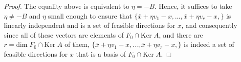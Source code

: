 \documentclass[10pt,a4paper]{amsart}
\newcommand{\Ker}[0]{\mathrm{Ker}\;}
\renewcommand{\dim}[0]{\mathrm{dim}\;}
\begin{document}
\begin{proof}
        \vspace{5mm}
        
        The equality above is equivalent to $\eta = -B$. Hence, it suffices to take $\eta\neq -B$ and $\eta$ small enough to ensure that $\{\overline{x}+\eta v_1 - x,\dots,\overline{x}+\eta v_r - x,\}$ is linearly independent and is a set of feasible directions for $x$, and consequently since all of these vectors are elements of $F_0 \cap \Ker A$, and there are $r=\dim F_0 \cap \Ker A$ of them, $\{\overline{x}+\eta v_1 - x,\dots,\overline{x}+\eta v_r - x,\}$ is indeed a set of feasible directions for $x$ that is a basis of $F_0\cap \Ker A$.
        \end{proof}
\end{document}
